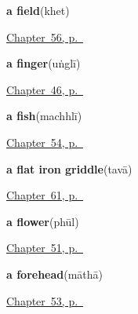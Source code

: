 \noindent\begin{minipage}[t]{\linewidth}
\raggedright
\textbf{a field}\enspace\emph{}\enspace(khet)\par
\footnotesize \hyperref[ch:hi-the-road]{Chapter~56, p.~\pageref*{ch:hi-the-road}}
\end{minipage}\par\smallskip

\noindent\begin{minipage}[t]{\linewidth}
\raggedright
\textbf{a finger}\enspace\emph{}\enspace(uṅglī)\par
\footnotesize \hyperref[ch:hi-body-more]{Chapter~46, p.~\pageref*{ch:hi-body-more}}
\end{minipage}\par\smallskip

\noindent\begin{minipage}[t]{\linewidth}
\raggedright
\textbf{a fish}\enspace\emph{}\enspace(machhlī)\par
\footnotesize \hyperref[ch:hi-animals]{Chapter~54, p.~\pageref*{ch:hi-animals}}
\end{minipage}\par\smallskip

\noindent\begin{minipage}[t]{\linewidth}
\raggedright
\textbf{a flat iron griddle}\enspace\emph{}\enspace(tavā)\par
\footnotesize \hyperref[ch:hi-at-the-cooking-fire]{Chapter~61, p.~\pageref*{ch:hi-at-the-cooking-fire}}
\end{minipage}\par\smallskip

\noindent\begin{minipage}[t]{\linewidth}
\raggedright
\textbf{a flower}\enspace\emph{}\enspace(phūl)\par
\footnotesize \hyperref[ch:hi-welcoming-a-guest]{Chapter~51, p.~\pageref*{ch:hi-welcoming-a-guest}}
\end{minipage}\par\smallskip

\noindent\begin{minipage}[t]{\linewidth}
\raggedright
\textbf{a forehead}\enspace\emph{}\enspace(māthā)\par
\footnotesize \hyperref[ch:hi-more-of-the-body]{Chapter~53, p.~\pageref*{ch:hi-more-of-the-body}}
\end{minipage}\par\smallskip

